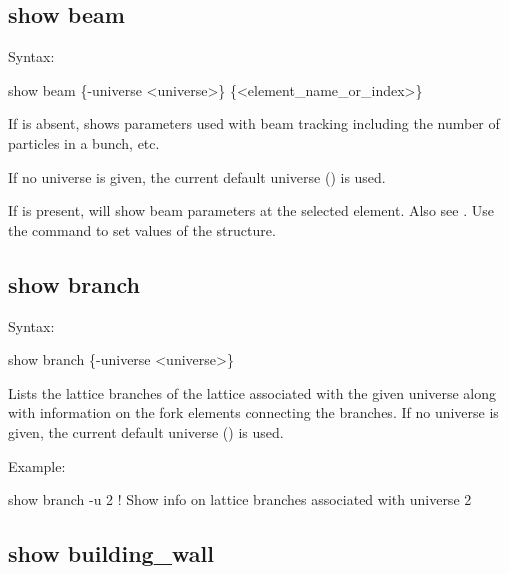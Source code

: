 {{{{{{{{%

\subsection{show beam}
\label{s:show.beam}

Syntax:
\begin{example}
  show beam \{-universe <universe>\} \{<element_name_or_index>\}
\end{example}

If  is absent,  shows parameters used with beam tracking
including the number of particles in a bunch, etc. 

If no universe is given, the current default universe () is used.

If  is present,  will show beam parameters at the selected
element. Also see .  Use the  command to set values of the
 structure.


\subsection{show branch}
\label{s:show.branch}

Syntax:
\begin{example}
  show branch \{-universe <universe>\}
\end{example}

Lists the lattice branches of the lattice associated with the given universe along with
information on the fork elements connecting the branches.  If no universe is given, the
current default universe () is used.

Example:
\begin{example}
  show branch -u 2     ! Show info on lattice branches associated with universe 2
\end{example}


\subsection{show building_wall}
\label{s:show.building}

}}}}}}}}
